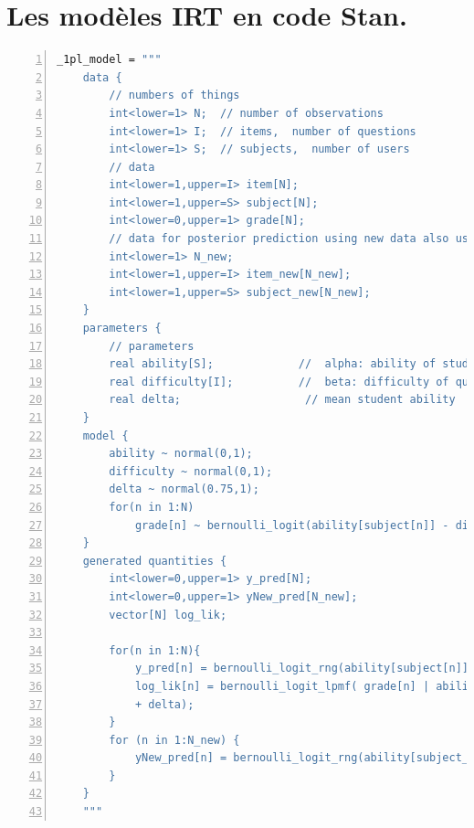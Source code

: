 \appendix
{}
\thispagestyle{empty}
\chapter{Les modèles IRT en code Stan.}


\begin{lstlisting}[language=Stan,caption={Code Stan pour le modèle de Rasch},basicstyle=\scriptsize, frame=lines,framesep=4.5mm,framexleftmargin=2.5mm,tabsize=2,numbers=left,fillcolor=\color{white},rulecolor=\color{black},numberstyle=\normalfont\scriptsize\color{black}]
    _1pl_model = """
    data {
        // numbers of things
        int<lower=1> N;  // number of observations
        int<lower=1> I;  // items,  number of questions  
        int<lower=1> S;  // subjects,  number of users 
        // data
        int<lower=1,upper=I> item[N];
        int<lower=1,upper=S> subject[N];
        int<lower=0,upper=1> grade[N];
        // data for posterior prediction using new data also used for Cross-validation
        int<lower=1> N_new;
        int<lower=1,upper=I> item_new[N_new];
        int<lower=1,upper=S> subject_new[N_new];
    }
    parameters {
        // parameters
        real ability[S];             //  alpha: ability of student
        real difficulty[I];          //  beta: difficulty of question
        real delta;                   // mean student ability
    }
    model {
        ability ~ normal(0,1);         
        difficulty ~ normal(0,1);   
        delta ~ normal(0.75,1);
        for(n in 1:N)
            grade[n] ~ bernoulli_logit(ability[subject[n]] - difficulty[item[n]] + delta);
    }
    generated quantities {
        int<lower=0,upper=1> y_pred[N];
        int<lower=0,upper=1> yNew_pred[N_new];
        vector[N] log_lik;

        for(n in 1:N){
            y_pred[n] = bernoulli_logit_rng(ability[subject[n]] - difficulty[item[n]] + delta);
            log_lik[n] = bernoulli_logit_lpmf( grade[n] | ability[subject[n]] - difficulty[item[n]]
            + delta);
        }
        for (n in 1:N_new) {
            yNew_pred[n] = bernoulli_logit_rng(ability[subject_new[n]] - difficulty[item_new[n]] + delta);                                             
        }
    }
    """
\end{lstlisting}
\newpage

